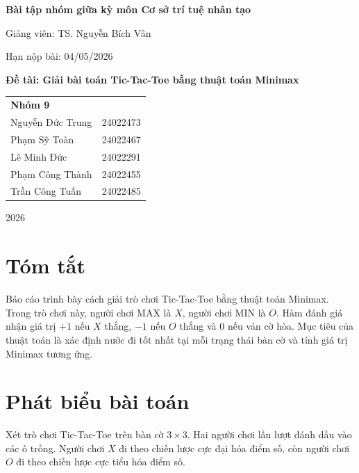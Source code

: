 \documentclass[12pt,a4paper]{article}
\begin{document}
\begin{titlepage}
    \centering
    {\Large \textbf{Bài tập nhóm giữa kỳ môn Cơ sở trí tuệ nhân tạo}\par}
    \vspace{1.2cm}

    {\large Giảng viên: TS. Nguyễn Bích Vân\par}
    \vspace{0.4cm}
    {\large Hạn nộp bài: 04/05/2026\par}

    \vspace{1.8cm}
    {\large \textbf{Đề tài: Giải bài toán Tic-Tac-Toe bằng thuật toán Minimax}\par}

    \vspace{1.5cm}
    \begin{tabular}{ll}
        \textbf{Nhóm 9} & \\
        Nguyễn Đức Trung & 24022473\\
        Phạm Sỹ Toàn & 24022467\\
        Lê Minh Đức & 24022291\\
        Phạm Công Thành & 24022455\\
        Trần Công Tuấn & 24022485
    \end{tabular}

    \vfill
    {\large 2026\par}
\end{titlepage}

\tableofcontents
\newpage

\section{Tóm tắt}

Báo cáo trình bày cách giải trò chơi Tic-Tac-Toe bằng thuật toán Minimax.
Trong trò chơi này, người chơi MAX là $X$, người chơi MIN là $O$.
Hàm đánh giá nhận giá trị $+1$ nếu $X$ thắng, $-1$ nếu $O$ thắng và $0$ nếu ván cờ hòa.
Mục tiêu của thuật toán là xác định nước đi tốt nhất tại mỗi trạng thái bàn cờ và tính giá trị Minimax tương ứng.

\section{Phát biểu bài toán}

Xét trò chơi Tic-Tac-Toe trên bàn cờ $3 \times 3$.
Hai người chơi lần lượt đánh dấu vào các ô trống.
Người chơi $X$ đi theo chiến lược cực đại hóa điểm số, còn người chơi $O$ đi theo chiến lược cực tiểu hóa điểm số.
\end{document}
